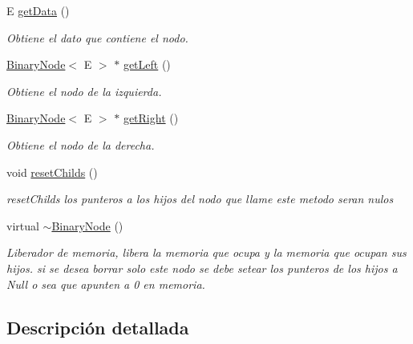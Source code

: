 \begin{DoxyCompactItemize}
E \hyperlink{classBinaryNode_af2163a11c5541f985f44012a7b9e639a}{get\-Data} ()
\begin{DoxyCompactList}\small\item\em Obtiene el dato que contiene el nodo. \end{DoxyCompactList}\item 
\hyperlink{classBinaryNode}{Binary\-Node}$<$ E $>$ $\ast$ \hyperlink{classBinaryNode_ab9b188aa3673f1b7c05e64664f00d766}{get\-Left} ()
\begin{DoxyCompactList}\small\item\em Obtiene el nodo de la izquierda. \end{DoxyCompactList}\item 
\hyperlink{classBinaryNode}{Binary\-Node}$<$ E $>$ $\ast$ \hyperlink{classBinaryNode_a4278dd3984a688ad0f72fdd3567aad5d}{get\-Right} ()
\begin{DoxyCompactList}\small\item\em Obtiene el nodo de la derecha. \end{DoxyCompactList}\item 
\hypertarget{classBinaryNode_aa9c499024d66d462aa9f7d9df0fb7c60}{void \hyperlink{classBinaryNode_aa9c499024d66d462aa9f7d9df0fb7c60}{reset\-Childs} ()}\label{classBinaryNode_aa9c499024d66d462aa9f7d9df0fb7c60}

\begin{DoxyCompactList}\small\item\em reset\-Childs los punteros a los hijos del nodo que llame este metodo seran nulos \end{DoxyCompactList}\item 
\hypertarget{classBinaryNode_a5f14ccd899c22516a360cf84cd75d6fa}{virtual \hyperlink{classBinaryNode_a5f14ccd899c22516a360cf84cd75d6fa}{$\sim$\-Binary\-Node} ()}\label{classBinaryNode_a5f14ccd899c22516a360cf84cd75d6fa}

\begin{DoxyCompactList}\small\item\em Liberador de memoria, libera la memoria que ocupa y la memoria que ocupan sus hijos. si se desea borrar solo este nodo se debe setear los punteros de los hijos a Null o sea que apunten a 0 en memoria. \end{DoxyCompactList}\end{DoxyCompactItemize}


\subsection{Descripción detallada}
